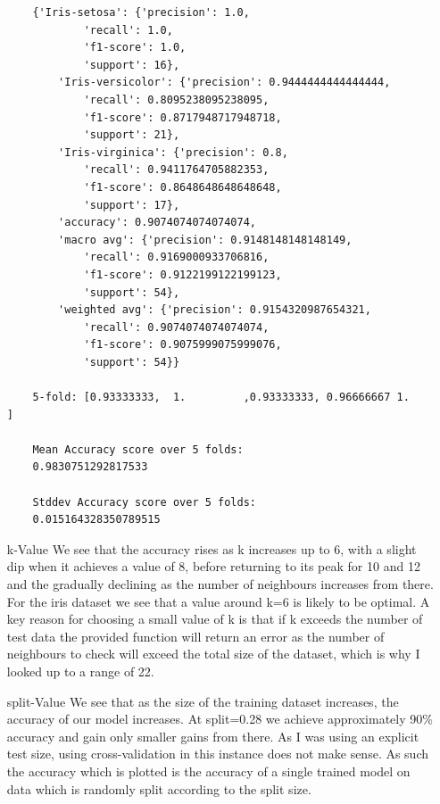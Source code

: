 \documentclass{article}
\begin{document}
\begin{enumerate}
\begin{verbatim}
	{'Iris-setosa': {'precision': 1.0,
			'recall': 1.0,
			'f1-score': 1.0,
			'support': 16},
		'Iris-versicolor': {'precision': 0.9444444444444444,
			'recall': 0.8095238095238095,
			'f1-score': 0.8717948717948718,
			'support': 21},
		'Iris-virginica': {'precision': 0.8,
			'recall': 0.9411764705882353,
			'f1-score': 0.8648648648648648,
			'support': 17},
		'accuracy': 0.9074074074074074,
		'macro avg': {'precision': 0.9148148148148149,
			'recall': 0.9169000933706816,
			'f1-score': 0.9122199122199123,
			'support': 54},
		'weighted avg': {'precision': 0.9154320987654321,
			'recall': 0.9074074074074074,
			'f1-score': 0.9075999075999076,
			'support': 54}}
		
	5-fold: [0.93333333,  1.         ,0.93333333, 0.96666667 1.       ]
	
	Mean Accuracy score over 5 folds: 
	0.9830751292817533
	
	Stddev Accuracy score over 5 folds: 
	0.015164328350789515
\end{verbatim}

\newpage
\item[k-Value] We see that the accuracy rises as k increases up to 6, with a slight dip when it achieves a value of 8, before returning to its peak for 10 and 12 and the gradually declining as the number of neighbours increases from there. For the iris dataset we see that a value around k=6 is likely to be optimal. A key reason for choosing a small value of k is that if k exceeds the number of test data the provided function will return an error as the number of neighbours to check will exceed the total size of the dataset, which is why I looked up to a range of 22. 

\item[split-Value] We see that as the size of the training dataset increases, the accuracy of our model increases. At split=0.28 we achieve approximately 90\% accuracy and gain only smaller gains from there. As I was using an explicit test size, using cross-validation in this instance does not make sense. As such the accuracy which is plotted is the accuracy of a single trained model on data which is randomly split according to the split size.

\end{enumerate}
\end{document}
